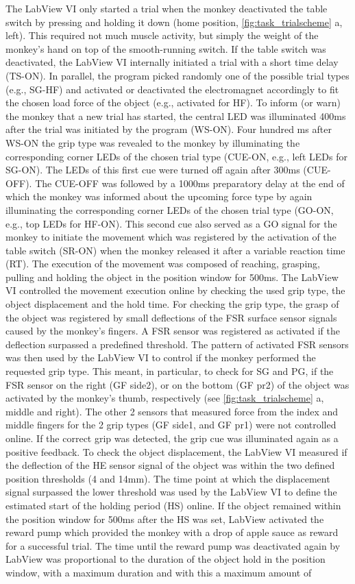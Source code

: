 The LabView VI only started a trial when the monkey deactivated the table switch by pressing and holding it down (home position, \cref{fig:task_trialscheme} a, left). This required not much muscle activity, but simply the weight of the monkey's hand on top of the smooth-running switch. If the table switch was deactivated, the LabView VI internally initiated a trial with a short time delay (TS-ON). In parallel, the program picked randomly one of the possible trial types (e.g., SG-HF) and activated or deactivated the electromagnet accordingly to fit the chosen load force of the object (e.g., activated for HF). To inform (or warn) the monkey that a new trial has started, the central LED was illuminated 400ms after the trial was initiated by the program (WS-ON). Four hundred ms after WS-ON the grip type was revealed to the monkey by illuminating the corresponding corner LEDs of the chosen trial type (CUE-ON, e.g., left LEDs for SG-ON). The LEDs of this first cue were turned off again after 300ms (CUE-OFF). The CUE-OFF was followed by a 1000ms preparatory delay at the end of which the monkey was informed about the upcoming force type by again illuminating the corresponding corner LEDs of the chosen trial type (GO-ON, e.g., top LEDs for HF-ON). This second cue also served as a GO signal for the monkey to initiate the movement which was registered by the activation of the table switch (SR-ON) when the monkey released it after a variable reaction time (RT). The execution of the movement was composed of reaching, grasping, pulling and holding the object in the position window for 500ms. The LabView VI controlled the movement execution online by checking the used grip type, the object displacement and the hold time. For checking the grip type, the grasp of the object was registered by small deflections of the FSR surface sensor signals caused by the monkey's fingers. A FSR sensor was registered as activated if the deflection surpassed a predefined threshold. The pattern of activated FSR sensors was then used by the LabView VI to control if the monkey performed the requested grip type. This meant, in particular, to check for SG and PG, if the FSR sensor on the right (GF side2), or on the bottom (GF pr2) of the object was activated by the monkey's thumb, respectively (see \cref{fig:task_trialscheme} a, middle and right). The other 2 sensors that measured force from the index and middle fingers for the 2 grip types (GF side1, and GF pr1) were not controlled online. If the correct grip was detected, the grip cue was illuminated again as a positive feedback. To check the object displacement, the LabView VI measured if the deflection of the HE sensor signal of the object was within the two defined position thresholds (4 and 14mm). The time point at which the displacement signal surpassed the lower threshold was used by the LabView VI to define the estimated start of the holding period (HS) online. If the object remained within the position window for 500ms after the HS was set, LabView activated the reward pump which provided the monkey with a drop of apple sauce as reward for a successful trial. The time until the reward pump was deactivated again by LabView was proportional to the duration of the object hold in the position window, with a maximum duration and with this a maximum amount of 